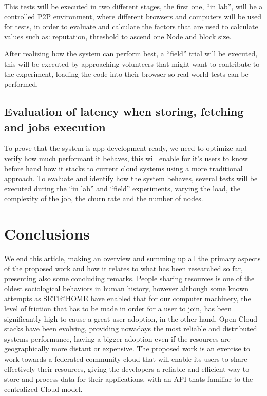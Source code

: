 \documentclass{./llncs2e/llncs}
\begin{document}
This tests will be executed in two different stages, the first one, ``in lab'', will be a controlled P2P environment, where different browsers and computers will be used for tests, in order to evaluate and calculate the factors that are used to calculate values such as: reputation, threshold to ascend one Node and block size. 

After realizing how the system can perform best, a ``field'' trial will be executed, this will be executed by approaching volunteers that might want to contribute to the experiment, loading the code into their browser so real world tests can be performed.

\subsection{Evaluation of latency when storing, fetching and jobs execution}

To prove that the system is app development ready, we need to optimize and verify how much performant it behaves, this will enable for it's users to know before hand how it stacks to current cloud systems using a more traditional approach. To evaluate and identify how the system behaves, several tests will be executed during the ``in lab'' and ``field'' experiments, varying the load, the complexity of the job, the churn rate and the number of nodes.



% 
% 

\section{Conclusions}

We end this article, making an overview and summing up all the primary aspects of the proposed work and how it relates to what has been researched so far, presenting also some concluding remarks.
People sharing resources is one of the oldest sociological behaviors in human history, however although some known attempts as SETI@HOME have enabled that for our computer machinery, the level of friction that has to be made in order for a user to join, has been significantly high to cause a great user adoption, in the other hand, Open Cloud stacks have been evolving, providing nowadays the most reliable and distributed systems performance, having a bigger adoption even if the resources are geographically more distant or expensive.
The proposed work is an exercise to work towards a federated community cloud that will enable its users to share effectively their resources, giving the developers a reliable and efficient way to store and process data for their applications, with an API thats familiar to the centralized Cloud model.
\end{document}
